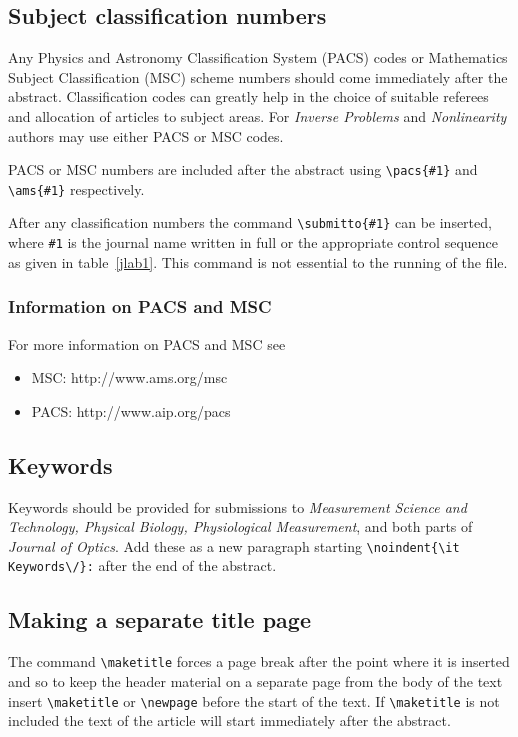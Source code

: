 \documentclass[12pt]{iopart}
\begin{document}
\subsection{Subject classification numbers}
Any Physics and Astronomy Classification System (PACS) 
codes or Mathematics Subject Classification (MSC) scheme 
numbers should come immediately after the abstract. 
Classification codes can greatly help in the choice of suitable 
referees and allocation of articles to subject areas. 
For {\it Inverse Problems} and {\it Nonlinearity} authors may 
use either PACS or MSC codes. 

PACS or MSC numbers are included after the abstract 
using \verb"\pacs{#1}" and \verb"\ams{#1}" respectively.

After any classification numbers the command
\verb"\submitto{#1}" can be inserted, where \verb"#1" is the journal name written in full or the appropriate control sequence as
given in table~\ref{jlab1}. This command is not essential to the running of the file.

\subsubsection{Information on PACS and MSC}
For more information on PACS and MSC see
\begin{itemize}
\item MSC: http://www.ams.org/msc
\item PACS: http://www.aip.org/pacs
\end{itemize}

\subsection{Keywords}
Keywords should be provided for submissions to {\it Measurement Science and Technology, Physical Biology, Physiological Measurement}, and both parts of {\it Journal of Optics\/}. Add these as a new paragraph starting \verb"\noindent{\it Keywords\/}:" after the end of the abstract.

\subsection{Making a separate title page}
The command \verb"\maketitle" forces a page break after the point where it
is inserted and so to keep the header material on a separate page from the
body of the text insert \verb"\maketitle" or \verb"\newpage" before the start of the text. 
If \verb"\maketitle" is not included the text of the
article will start immediately after the abstract.  
\end{document}
